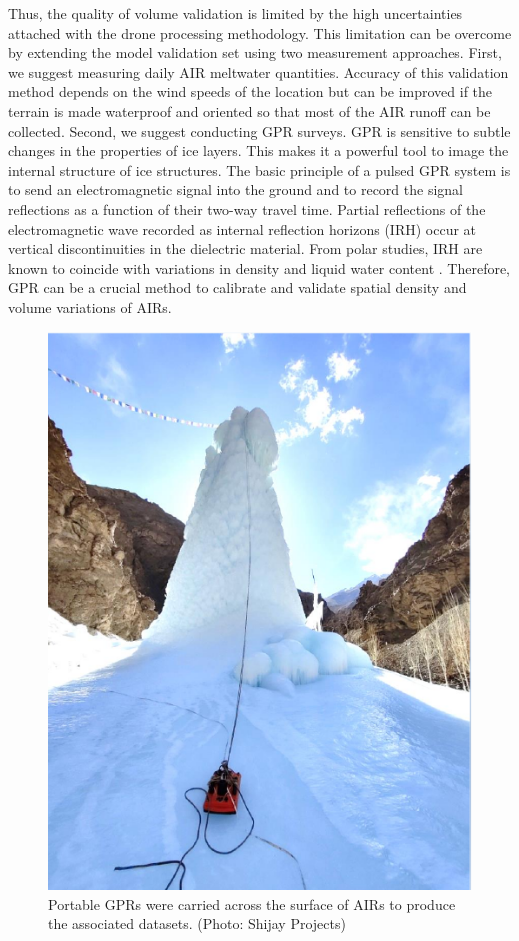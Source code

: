 Thus, the quality of volume validation is limited by the high uncertainties attached with the drone processing
methodology. This limitation can be overcome by extending the model validation set using two measurement
approaches. First, we suggest measuring daily AIR meltwater quantities. Accuracy of this validation method
depends on the wind speeds of the location but can be improved if the terrain is made waterproof and oriented so
that most of the AIR runoff can be collected. Second, we suggest conducting \ac{GPR} surveys. \ac{GPR} is
sensitive to subtle changes in the properties of ice layers. This makes it a powerful tool to image the internal
structure of ice structures. The basic principle of a pulsed \ac{GPR} system is to send an electromagnetic
signal into the ground and to record the signal reflections as a function of their two-way travel time. Partial
reflections of the electromagnetic wave recorded as internal reflection horizons (IRH) occur at vertical
discontinuities in the dielectric material. From polar studies, IRH are known to coincide with variations in
density and liquid water content \citep{forster2014extensive}. Therefore, \ac{GPR} can be a crucial method to
calibrate and validate spatial density and volume variations of \ac{AIRs}.


\begin{figure}[htb]
  \centering
	\includegraphics[width=8 cm]{figs/gpr_survey}
  \caption{Portable \ac{GPR}s were carried across the surface of \ac{AIRs} to produce the associated datasets.
    (Photo: Shijay Projects)}
	\label{fig:gpr_survey}
\end{figure}

